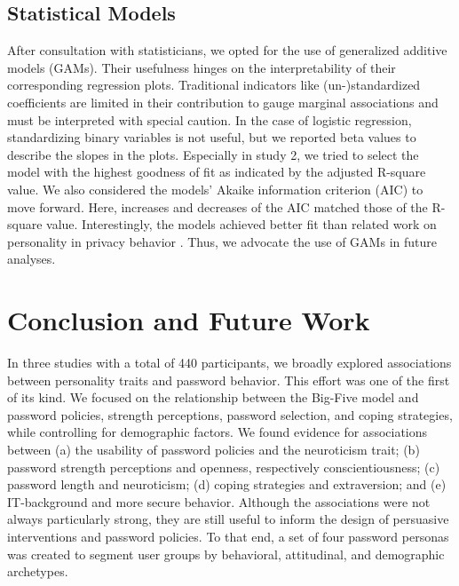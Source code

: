  
\subsection{Statistical Models}
After consultation with statisticians, we opted for the use of generalized additive models (GAMs). Their usefulness hinges on the interpretability of their corresponding regression plots. Traditional indicators like (un-)standardized coefficients are limited in their contribution to gauge marginal associations and must be interpreted with special caution. In the case of logistic regression, standardizing binary variables is not useful, but we reported beta values to describe the slopes in the plots. Especially in study 2, we tried to select the model with the highest goodness of fit as indicated by the adjusted R-square value. We also considered the models' Akaike information criterion (AIC) to move forward. Here, increases and decreases of the AIC matched those of the R-square value. Interestingly, the models achieved better fit than related work on personality in privacy behavior \cite{Egelman2015AverageUser}. Thus, we advocate the use of GAMs in future analyses.  

\section{Conclusion and Future Work}
In three studies with a total of 440 participants, we broadly explored associations between personality traits and password behavior. This effort was one of the first of its kind. We focused on the relationship between the Big-Five model and password policies, strength perceptions, password selection, and coping strategies, while controlling for demographic factors. We found evidence for associations between (a) the usability of password policies and the neuroticism trait; (b) password strength perceptions and openness, respectively conscientiousness; (c) password length and neuroticism; (d) coping strategies and extraversion; and (e) IT-background and more secure behavior. Although the associations were not always particularly strong, they are still useful to inform the design of persuasive interventions and password policies. To that end, a set of four password personas was created to segment user groups by behavioral, attitudinal, and demographic archetypes. 

